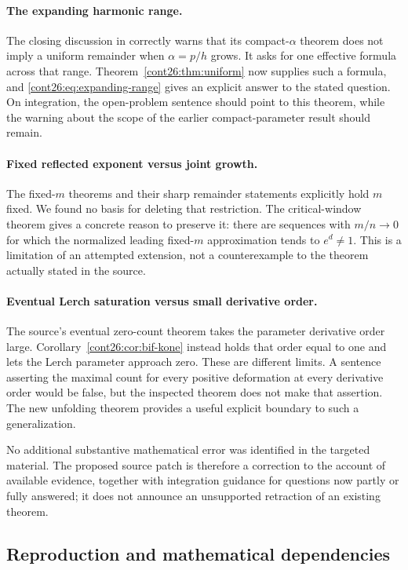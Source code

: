 \paragraph{The expanding harmonic range.}
The closing discussion in
 correctly warns that its
compact-$\alpha$ theorem does not imply a uniform remainder when
$\alpha=p/h$ grows. It asks for one effective formula across that
range. Theorem~\ref{cont26:thm:uniform} now supplies such a formula, and
\eqref{cont26:eq:expanding-range} gives an explicit answer to the stated
question. On integration, the open-problem sentence should point to
this theorem, while the warning about the scope of the earlier
compact-parameter result should remain.

\paragraph{Fixed reflected exponent versus joint growth.}
The fixed-$m$ theorems and their sharp remainder statements explicitly
hold $m$ fixed. We found no basis for deleting that restriction.
The critical-window theorem gives a concrete reason to preserve it:
there are sequences with $m/n\to0$ for which the normalized leading
fixed-$m$ approximation tends to $e^d\ne1$.
This is a limitation of an attempted extension, not a counterexample
to the theorem actually stated in the source.

\paragraph{Eventual Lerch saturation versus small derivative order.}
The source's eventual zero-count theorem takes the parameter
derivative order large. Corollary~\ref{cont26:cor:bif-kone} instead holds
that order equal to one and lets the Lerch parameter approach zero.
These are different limits. A sentence asserting the maximal count
for every positive deformation at every derivative order would be
false, but the inspected theorem does not make that assertion.
The new unfolding theorem provides a useful explicit boundary to
such a generalization.

No additional substantive mathematical error was identified in the
targeted material. The proposed source patch is therefore a correction
to the account of available evidence, together with integration
guidance for questions now partly or fully answered; it does not
announce an unsupported retraction of an existing theorem.

\subsection{Reproduction and mathematical dependencies}

